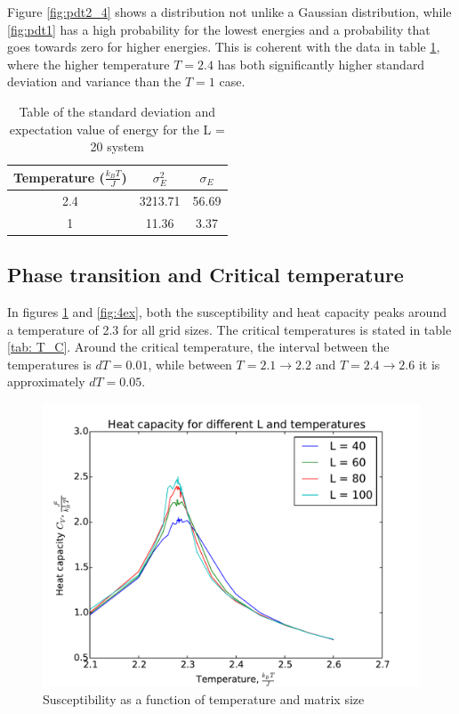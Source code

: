  Figure \ref{fig:pdt2_4} shows a distribution not unlike a Gaussian distribution, while  \ref{fig:pdt1} has a high probability for the lowest energies and a probability that goes towards zero for higher energies. This is coherent with the data in table \ref{tab:varians}, where the higher temperature $ T = 2.4 $ has both significantly higher standard deviation and variance than the $ T = 1 $ case. 

\begin{table}[H]\caption{Table of the standard deviation and expectation value of energy for the L = 20 system} \label{tab:varians}
	\begin{tabular}{ccc}
		Temperature ($ \frac{k_BT}{J} $)& $ \sigma_E^2 $&$ \sigma_E$ \\\hline
		2.4 &3213.71 & 56.69\\
				1 &11.36  & 3.37 
	\end{tabular}
\end{table}



\subsection{Phase transition and Critical temperature}

In figures \ref{fig:4ecv} and \ref{fig:4ex}, both the susceptibility and heat capacity peaks around  a temperature of 2.3  for all grid sizes. The critical temperatures is stated in table \ref{tab: T_C}. Around the critical temperature, the interval between the temperatures is $ dT = 0.01 $, while between $ T = 2.1\rightarrow2.2 $ and $ T = 2.4\rightarrow2.6  $ it is approximately $ dT = 0.05 $. 

\begin{figure}[H]
	\centering
	\includegraphics[width=0.7\linewidth]{../results/4e/4e_Cv}
	\caption{Susceptibility as a function of temperature and matrix size}
	\label{fig:4ecv}
\end{figure}

